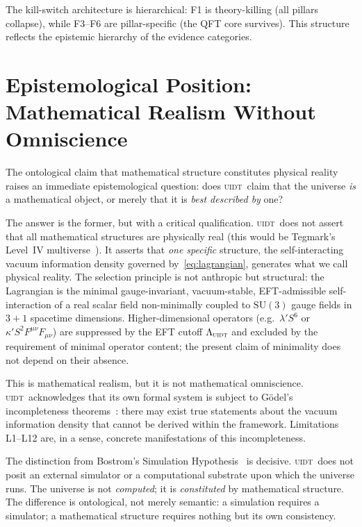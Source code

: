 \documentclass[12pt,a4paper,twoside]{article}
\theoremstyle{plain}
\theoremstyle{definition}
\theoremstyle{remark}
\newcommand{\UIDT}{\textsc{uidt}}
\begin{document}
The kill-switch architecture is hierarchical: F1 is theory-killing
(all pillars collapse), while F3--F6 are pillar-specific (the QFT core
survives). This structure reflects the epistemic hierarchy of the evidence
categories.



\newpage
\section{Epistemological Position: Mathematical Realism Without Omniscience}
\label{sec:epistemology}

The ontological claim that mathematical structure constitutes physical reality
raises an immediate epistemological question: does \UIDT\ claim that the
universe \emph{is} a mathematical object, or merely that it is \emph{best
described by} one?

The answer is the former, but with a critical qualification. \UIDT\ does not
assert that all mathematical structures are physically real (this would be
Tegmark's Level~IV multiverse~\cite{Tegmark2008}). It asserts that
\emph{one specific} structure, the self-interacting vacuum information
density governed by~\eqref{eq:lagrangian}, generates what we call physical
reality. The selection principle is not anthropic but structural: the Lagrangian is the minimal gauge-invariant, vacuum-stable, EFT-admissible
self-interaction of a real scalar field non-minimally coupled to $\mathrm{SU}(3)$
gauge fields in $3+1$ spacetime dimensions.  Higher-dimensional operators
(e.g.\ $\lambda' S^6$ or $\kappa' S^2 F^{\mu\nu}F_{\mu\nu}$) are suppressed
by the EFT cutoff $\Lambda_{\UIDT}$ and excluded by the requirement of
minimal operator content; the present claim of minimality does not depend on
their absence.

This is mathematical realism, but it is not mathematical omniscience. \UIDT\
acknowledges that its own formal system is subject to G\"odel's incompleteness
theorems~\cite{Goedel1931}: there may exist true statements about the vacuum
information density that cannot be derived within the framework. Limitations
L1--L12 are, in a sense, concrete manifestations of this incompleteness.

The distinction from Bostrom's Simulation Hypothesis~\cite{Bostrom2003} is
decisive. \UIDT\ does not posit an external simulator or a computational
substrate upon which the universe runs. The universe is not \emph{computed};
it is \emph{constituted} by mathematical structure. The difference is
ontological, not merely semantic: a simulation requires a simulator; a
mathematical structure requires nothing but its own consistency.
\end{document}
